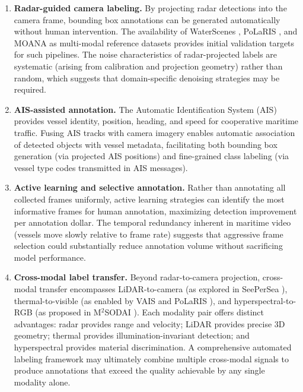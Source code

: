 \begin{enumerate}[leftmargin=*]
\item \textbf{Radar-guided camera labeling.} By projecting radar detections into the
    camera frame, bounding box annotations can be generated automatically without human
    intervention. The availability of WaterScenes \cite{Zhang2024WaterScenes}, PoLaRIS
    \cite{Choi2024PoLaRIS}, and MOANA \cite{Jang2024MOANA} as multi-modal reference
    datasets provides initial validation targets for such pipelines. The noise
    characteristics of radar-projected labels are systematic (arising from calibration
    and projection geometry) rather than random, which suggests that domain-specific
    denoising strategies may be required.

\item \textbf{AIS-assisted annotation.} The Automatic Identification System (AIS)
    provides vessel identity, position, heading, and speed for cooperative maritime
    traffic. Fusing AIS tracks with camera imagery enables automatic association of
    detected objects with vessel metadata, facilitating both bounding box generation
    (via projected AIS positions) and fine-grained class labeling (via vessel type
    codes transmitted in AIS messages).

\item \textbf{Active learning and selective annotation.} Rather than annotating all
    collected frames uniformly, active learning strategies can identify the most
    informative frames for human annotation, maximizing detection improvement per
    annotation dollar. The temporal redundancy inherent in maritime video (vessels
    move slowly relative to frame rate) suggests that aggressive frame selection
    could substantially reduce annotation volume without sacrificing model performance.

\item \textbf{Cross-modal label transfer.} Beyond radar-to-camera projection,
    cross-modal transfer encompasses LiDAR-to-camera (as explored in SeePerSea
    \cite{Jeong2024SeePerSea}), thermal-to-visible (as enabled by VAIS
    \cite{Zhang2015VAIS} and PoLaRIS \cite{Choi2024PoLaRIS}), and
    hyperspectral-to-RGB (as proposed in M$^2$SODAI \cite{Jang2023M2SODAI}).
    Each modality pair offers distinct advantages: radar provides range and velocity;
    LiDAR provides precise 3D geometry; thermal provides illumination-invariant
    detection; and hyperspectral provides material discrimination. A comprehensive
    automated labeling framework may ultimately combine multiple cross-modal signals
    to produce annotations that exceed the quality achievable by any single modality
    alone.
\end{enumerate}

